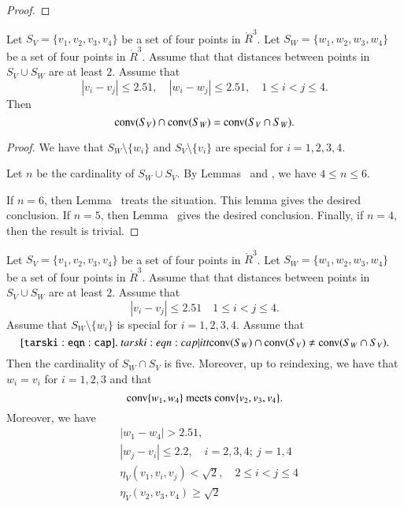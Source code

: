 \begin{proof}
\end{proof}

\newpage


\begin{lemma}
Let $S_V=\{v_1,v_2,v_3,v_4\}$ be a set of four
points in $\ring{R}^3$.  Let $S_W=\{w_1,w_2,w_3,w_4\}$ be a set
of four points in $\ring{R}^3$.  Assume that that distances
between points in $S_V\cup S_W$ are at least $2$.  Assume that
  $$
  |v_i-v_j|\le 2.51,\quad |w_i -w_j|\le 2.51,\quad 1\le i<j\le 4.
  $$
Then $${\operatorname{conv}}(S_V)\cap {\operatorname{conv}}(S_W) = {\operatorname{conv}}(S_V\cap S_W).$$
\end{lemma}

\begin{proof}
We have that $S_W\setminus\{w_i\}$ and $S_V\setminus\{v_i\}$ are
special for $i=1,2,3,4$.

Let $n$ be the cardinality of $S_W\cup S_V$.  By Lemmas~
and , we have $4\le n\le 6$.  

If $n=6$,
then Lemma~ treats the situation.  
This
lemma gives the desired conclusion.
If $n=5$, then Lemma~ gives the desired conclusion.
Finally, if $n=4$, then the result is trivial.
\end{proof}

\newpage

\begin{lemma}
Let $S_V=\{v_1,v_2,v_3,v_4\}$ be a set of four
points in $\ring{R}^3$.  Let $S_W=\{w_1,w_2,w_3,w_4\}$ be a set
of four points in $\ring{R}^3$.  Assume that that distances
between points in $S_V\cup S_W$ are at least $2$.  Assume that
  $$
  |v_i-v_j|\le 2.51\quad 1\le i<j\le 4.
  $$
Assume that $S_W\setminus\{w_i\}$ is special for $i=1,2,3,4$.
Assume that 
  \begin{equation}\tlabel{tarski:eqn:cap}
  \op{conv}(S_W)\cap \op{conv}(S_V)\ne \op{conv}(S_W\cap S_V).
  \end{equation}
Then the cardinality of
$S_W\cap S_V$ is five.  Moreover, up to reindexing, we have
that $w_i=v_i$ for $i=1,2,3$ and that
  $$
  {\operatorname{conv}}\{w_1,w_4\} \text{ meets } {\operatorname{conv}}\{v_2,v_3,v_4\}.
  $$
Moreover, we have
  $$
  \begin{array}{lll}
  &|w_1-w_4|>2.51,\quad \\
  &|w_j-v_i|\le 2.2,\quad i=2,3,4;\ j=1,4\\
  &\eta_V(v_1,v_i,v_j) < \sqrt2,\quad 2\le i < j \le 4\\
  &\eta_V(v_2,v_3,v_4) \ge \sqrt2\\
  \end{array}
  $$
\end{lemma}

